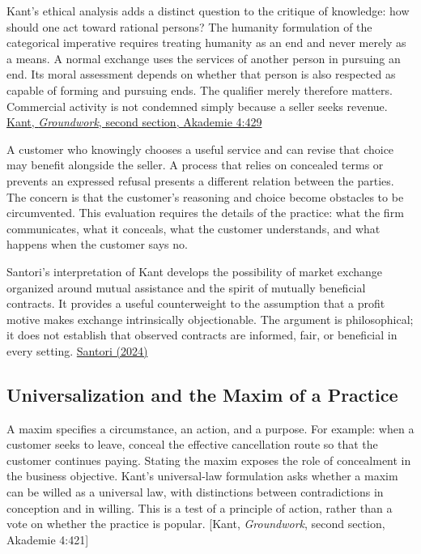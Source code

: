 \noindent \noindent Kant's ethical analysis adds a distinct question to the
critique of knowledge: how should one act toward rational persons? The
humanity formulation of the categorical imperative requires treating
humanity as an end and never merely as a means. A normal exchange uses
the services of another person in pursuing an end. Its moral assessment
depends on whether that person is also respected as capable of forming
and pursuing ends. The qualifier merely therefore matters. Commercial
activity is not condemned simply because a seller seeks revenue.
\href{https://www.gutenberg.org/files/5682/5682-h/5682-h.htm}{Kant,
\emph{Groundwork}, second section, Akademie 4:429}

A customer who knowingly chooses a useful service and can revise that
choice may benefit alongside the seller. A process that relies on
concealed terms or prevents an expressed refusal presents a different
relation between the parties. The concern is that the customer's
reasoning and choice become obstacles to be circumvented. This
evaluation requires the details of the practice: what the firm
communicates, what it conceals, what the customer understands, and what
happens when the customer says no.

Santori's interpretation of Kant develops the possibility of market
exchange organized around mutual assistance and the spirit of mutually
beneficial contracts. It provides a useful counterweight to the
assumption that a profit motive makes exchange intrinsically
objectionable. The argument is philosophical; it does not establish that
observed contracts are informed, fair, or beneficial in every setting.
\href{https://link.springer.com/article/10.1007/s40926-024-00252-z}{Santori
(2024)}

\hypertarget{M09-universalization-and-the-maxim-of-a-practice}{%
\subsection{Universalization and the Maxim of a
Practice}\label{M09-universalization-and-the-maxim-of-a-practice}}

\noindent \noindent A maxim specifies a circumstance, an action, and a purpose.
For example: when a customer seeks to leave, conceal the effective
cancellation route so that the customer continues paying. Stating the
maxim exposes the role of concealment in the business objective. Kant's
universal-law formulation asks whether a maxim can be willed as a
universal law, with distinctions between contradictions in conception
and in willing. This is a test of a principle of action, rather than a
vote on whether the practice is popular. {[}Kant, \emph{Groundwork},
second section, Akademie 4:421{]}

